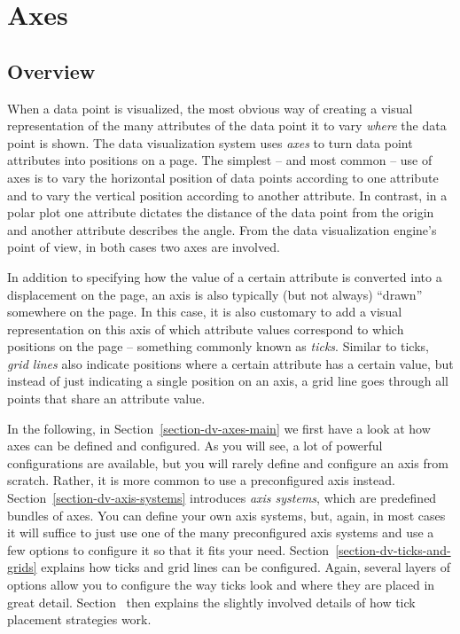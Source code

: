 %
%
%


\section{Axes}
\label{section-dv-axes}


\subsection{Overview}

When a data point is visualized, the most obvious way of creating a
visual representation of the many attributes of the data point it to
vary \emph{where} the data point is shown. The data visualization
system uses \emph{axes} to turn data point attributes into positions
on a page. The simplest -- and most common -- use of axes is to vary
the horizontal position of data points according to one attribute and
to vary the vertical position according to another attribute. In
contrast, in a polar plot one attribute dictates the distance of the
data point from the origin and another attribute describes the
angle. From the data visualization engine's point of view, in both
cases two axes are involved.

In addition to specifying how the value of a certain attribute is
converted into a displacement on the page, an axis is also typically
(but not always) ``drawn'' somewhere on the page. In this case, it is
also customary to add a visual representation on this axis of which
attribute values correspond to which positions on the page --
something commonly known as \emph{ticks}. Similar to ticks, \emph{grid
  lines} also indicate positions where a certain attribute has a
certain value, but instead of just indicating a single position on an
axis, a grid line goes through all points that share an attribute
value.

In the following, in Section~\ref{section-dv-axes-main} we first have
a look at how axes can be defined and configured. As you will see, a
lot of powerful configurations are available, but you will rarely
define and configure an axis from scratch. Rather, it is more common
to use a preconfigured axis
instead. Section~\ref{section-dv-axis-systems} introduces \emph{axis
  systems}, which are predefined bundles of axes. You can define your
own axis systems, but, again, in most cases it will suffice to just
use one of the many preconfigured axis systems and use a few options
to configure it so that it fits your
need. Section~\ref{section-dv-ticks-and-grids} explains how ticks and
grid lines can be configured. Again, several layers of
options allow you to configure the way ticks look and where they are
placed in great
detail. Section~\label{section-dv-tick-placement-strategies} then
explains the slightly involved details of how tick placement
strategies work.

